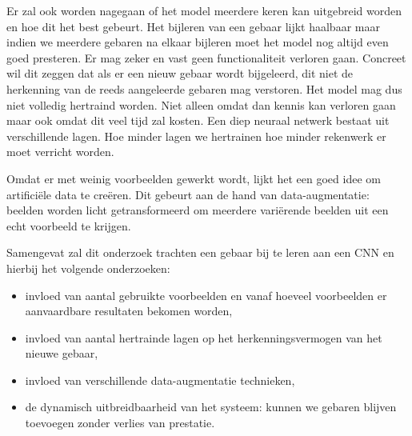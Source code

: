 \npar Er zal ook worden nagegaan of het model meerdere keren kan uitgebreid worden en hoe dit het best gebeurt. Het bijleren van een gebaar lijkt haalbaar maar indien we meerdere gebaren na elkaar bijleren moet het model nog altijd even goed presteren. Er mag zeker en vast geen functionaliteit verloren gaan. Concreet wil dit zeggen dat als er een nieuw gebaar wordt bijgeleerd, dit niet de herkenning van de reeds aangeleerde gebaren mag verstoren. Het model mag dus niet volledig hertraind worden. Niet alleen omdat dan kennis kan verloren gaan maar ook omdat dit veel tijd zal kosten. Een diep neuraal netwerk bestaat uit verschillende lagen. Hoe minder lagen we hertrainen hoe minder rekenwerk er moet verricht worden.

\npar Omdat er met weinig voorbeelden gewerkt wordt, lijkt het een goed idee om artifici\"ele data te cre\"eren. Dit gebeurt aan de hand van data-augmentatie: beelden worden licht getransformeerd om meerdere vari\"erende beelden uit een echt voorbeeld te krijgen.

\npar Samengevat zal dit onderzoek trachten een gebaar bij te leren aan een CNN en hierbij het volgende onderzoeken:
\begin{itemize}
	\item invloed van aantal gebruikte voorbeelden en vanaf hoeveel voorbeelden er aanvaardbare resultaten bekomen worden,
	\item invloed van aantal hertrainde lagen op het herkenningsvermogen van het nieuwe gebaar,
	\item invloed van verschillende data-augmentatie technieken,
	\item de dynamisch uitbreidbaarheid van het systeem: kunnen we gebaren blijven toevoegen zonder verlies van prestatie.
\end{itemize}






 